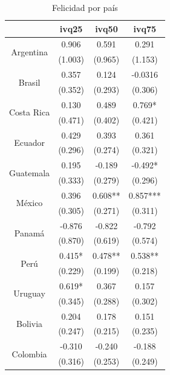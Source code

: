 
\begin{table}[htbp]
  \centering
  \caption{Felicidad por país}
    \begin{tabular}{cccc}
          & \textbf{ivq25} & \textbf{ivq50} & \textbf{ivq75} \\
    \midrule
    \multicolumn{1}{c}{\multirow{2}[2]{*}{Argentina}} & 0.906 & 0.591 & 0.291 \\
          & (1.003) & (0.965) & (1.153) \\
    \midrule
    \multicolumn{1}{c}{\multirow{2}[2]{*}{Brasil}} & 0.357 & 0.124 & -0.0316 \\
          & (0.352) & (0.293) & (0.306) \\
    \midrule
    \multicolumn{1}{c}{\multirow{2}[2]{*}{Costa Rica}} & 0.130 & 0.489 & 0.769* \\
          & (0.471) & (0.402) & (0.421) \\
    \midrule
    \multicolumn{1}{c}{\multirow{2}[2]{*}{Ecuador}} & 0.429 & 0.393 & 0.361 \\
          & (0.296) & (0.274) & (0.321) \\
    \midrule
    \multicolumn{1}{c}{\multirow{2}[2]{*}{Guatemala}} & 0.195 & -0.189 & -0.492* \\
          & (0.333) & (0.279) & (0.296) \\
    \midrule
    \multicolumn{1}{c}{\multirow{2}[2]{*}{México}} & 0.396 & 0.608** & 0.857*** \\
          & (0.305) & (0.271) & (0.311) \\
    \midrule
    \multicolumn{1}{c}{\multirow{2}[2]{*}{Panamá}} & -0.876 & -0.822 & -0.792 \\
          & (0.870) & (0.619) & (0.574) \\
    \midrule
    \multicolumn{1}{c}{\multirow{2}[2]{*}{Perú}} & 0.415* & 0.478** & 0.538** \\
          & (0.229) & (0.199) & (0.218) \\
    \midrule
    \multicolumn{1}{c}{\multirow{2}[2]{*}{Uruguay}} & 0.619* & 0.367 & 0.157 \\
          & (0.345) & (0.288) & (0.302) \\
    \midrule
    \multicolumn{1}{c}{\multirow{2}[2]{*}{Bolivia}} & 0.204 & 0.178 & 0.151 \\
          & (0.247) & (0.215) & (0.235) \\
    \midrule
    \multicolumn{1}{c}{\multirow{2}[2]{*}{Colombia}} & -0.310 & -0.240 & -0.188 \\
          & (0.316) & (0.253) & (0.249) \\

\end{tabular}
\end{table}
